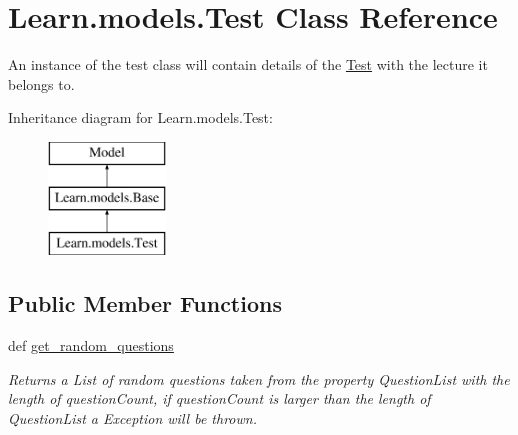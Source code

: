\hypertarget{class_learn_1_1models_1_1_test}{\section{Learn.\-models.\-Test Class Reference}
\label{class_learn_1_1models_1_1_test}
}


An instance of the test class will contain details of the \hyperlink{class_learn_1_1models_1_1_test}{Test} with the lecture it belongs to.  


Inheritance diagram for Learn.\-models.\-Test\-:\begin{figure}[H]
\begin{center}
\leavevmode
\includegraphics[height=3.000000cm]{class_learn_1_1models_1_1_test}
\end{center}
\end{figure}
\subsection*{Public Member Functions}
\begin{DoxyCompactItemize}
\item 
\hypertarget{class_learn_1_1models_1_1_test_a020a2bfa27be99f131c0c9491aff53f8}{def \hyperlink{class_learn_1_1models_1_1_test_a020a2bfa27be99f131c0c9491aff53f8}{get\-\_\-random\-\_\-questions}}\label{class_learn_1_1models_1_1_test_a020a2bfa27be99f131c0c9491aff53f8}

\begin{DoxyCompactList}\small\item\em Returns a List of random questions taken from the property Question\-List with the length of question\-Count, if question\-Count is larger than the length of Question\-List a Exception will be thrown. \end{DoxyCompactList}\end{DoxyCompactItemize}
